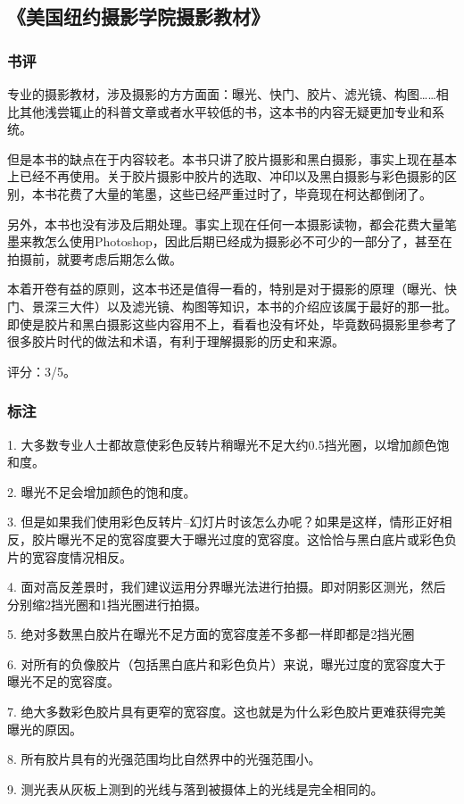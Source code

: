 \subsection{《美国纽约摄影学院摄影教材》}
\subsubsection{书评}
专业的摄影教材，涉及摄影的方方面面：曝光、快门、胶片、滤光镜、构图……相比其他浅尝辄止的科普文章或者水平较低的书，这本书的内容无疑更加专业和系统。

但是本书的缺点在于内容较老。本书只讲了胶片摄影和黑白摄影，事实上现在基本上已经不再使用。关于胶片摄影中胶片的选取、冲印以及黑白摄影与彩色摄影的区别，本书花费了大量的笔墨，这些已经严重过时了，毕竟现在柯达都倒闭了。

另外，本书也没有涉及后期处理。事实上现在任何一本摄影读物，都会花费大量笔墨来教怎么使用Photoshop，因此后期已经成为摄影必不可少的一部分了，甚至在拍摄前，就要考虑后期怎么做。

本着开卷有益的原则，这本书还是值得一看的，特别是对于摄影的原理（曝光、快门、景深三大件）以及滤光镜、构图等知识，本书的介绍应该属于最好的那一批。即使是胶片和黑白摄影这些内容用不上，看看也没有坏处，毕竟数码摄影里参考了很多胶片时代的做法和术语，有利于理解摄影的历史和来源。

评分：3/5。

\subsubsection{标注}
1. 大多数专业人士都故意使彩色反转片稍曝光不足大约0.5挡光圈，以增加颜色饱和度。

2. 曝光不足会增加颜色的饱和度。

3. 但是如果我们使用彩色反转片--幻灯片时该怎么办呢？如果是这样，情形正好相反，胶片曝光不足的宽容度要大于曝光过度的宽容度。这恰恰与黑白底片或彩色负片的宽容度情况相反。

4. 面对高反差景时，我们建议运用分界曝光法进行拍摄。即对阴影区测光，然后分别缩2挡光圈和1挡光圈进行拍摄。

5. 绝对多数黑白胶片在曝光不足方面的宽容度差不多都一样即都是2挡光圈

6. 对所有的负像胶片（包括黑白底片和彩色负片）来说，曝光过度的宽容度大于曝光不足的宽容度。

7. 绝大多数彩色胶片具有更窄的宽容度。这也就是为什么彩色胶片更难获得完美曝光的原因。

8. 所有胶片具有的光强范围均比自然界中的光强范围小。

9. 测光表从灰板上测到的光线与落到被摄体上的光线是完全相同的。

